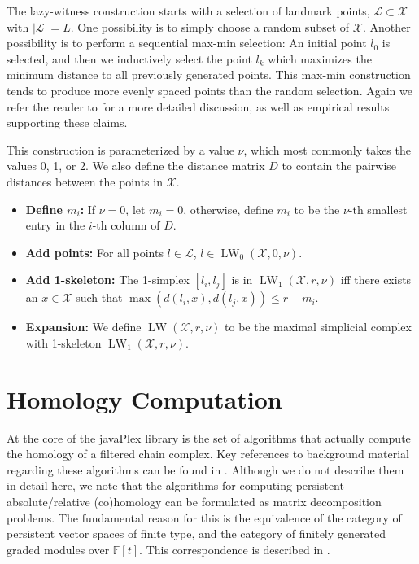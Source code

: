 The lazy-witness construction starts with a selection of landmark points, $\mathcal{L} \subset \mathcal{X}$ with $|\mathcal{L}| = L$. One possibility is to simply choose a random subset of $\mathcal{X}$. Another possibility is to perform a sequential max-min selection: An initial point $l_0$ is selected, and then we inductively select the point $l_k$ which maximizes the minimum distance to all previously generated points. This max-min construction tends to produce more evenly spaced points than the random selection. Again we refer the reader to \cite{Witness} for a more detailed discussion, as well as empirical results supporting these claims.

This construction is parameterized by a value $\nu$, which most commonly takes the values 0, 1, or 2. We also define the distance matrix $D$ to contain the pairwise distances between the points in $\mathcal{X}$. 

\begin{itemize}
\item {\bf Define $m_i$:} If $\nu = 0$, let $m_i = 0$, otherwise, define $m_i$ to be the $\nu$-th smallest entry in the $i$-th column of $D$.
\item {\bf Add points:} For all points $l \in \mathcal{L}$, $l \in \mathop{\mathrm{LW}}_0(\mathcal{X}, 0, \nu)$.
\item {\bf Add 1-skeleton:} The 1-simplex $[l_i, l_j]$ is in $\mathop{\mathrm{LW}}_1(\mathcal{X}, r, \nu)$ iff there exists an $x \in \mathcal{X}$ such that $\max(d(l_i, x), d(l_j, x)) \leq r + m_i$.
\item {\bf Expansion:} We define $\mathop{\mathrm{LW}} (\mathcal{X}, r, \nu)$ to be the maximal simplicial complex with 1-skeleton $\mathop{\mathrm{LW}}_1(\mathcal{X}, r, \nu)$. 
\end{itemize}

\section{Homology Computation}

At the core of the javaPlex library is the set of algorithms that actually compute the homology of a filtered chain complex. Key references to background material regarding these algorithms can be found in \cite{Carlsson_04,Dualities}. Although we do not describe them in detail here, we note that the algorithms for computing persistent absolute/relative (co)homology can be formulated as matrix decomposition problems. The fundamental reason for this is the equivalence of the category of persistent vector spaces of finite type, and the category of finitely generated graded modules over $\mathbb{F}[t]$. This correspondence is described in \cite{Carlsson_04}. 

